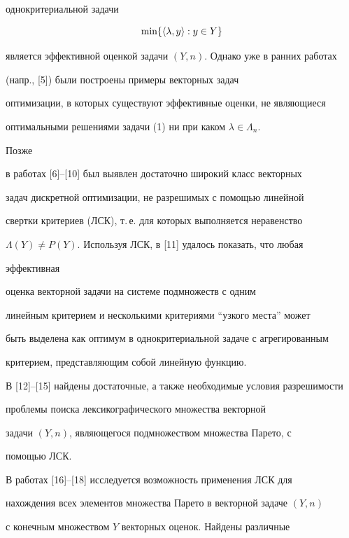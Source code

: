 однокритериальной задачи 


\begin{equation} 


\min\{\la\lambda,y\ra:y\in Y\} 


\end{equation} 


является эффективной оценкой задачи $(Y,n)$. Однако уже в ранних работах 


(напр., [5]) были построены примеры векторных задач 


оптимизации, в которых существуют эффективные оценки, не являющиеся 


оптимальными решениями задачи (1) ни при каком $\lambda\in\Lambda_n$. 


Позже 


в работах [6]--[10] был выявлен достаточно широкий класс векторных 


задач дискретной оптимизации, не разрешимых с помощью линейной 


свертки критериев (ЛСК), т.\,е. для которых выполняется неравенство 


$\Lambda(Y)\ne P(Y)$. Используя ЛСК, в [11] удалось показать, что любая 


эффективная 


оценка векторной задачи на системе подмножеств с одним 


линейным критерием и несколькими критериями ``узкого места'' может 


быть выделена как оптимум в однокритериальной задаче с агрегированным 


критерием, представляющим собой линейную функцию. 


 


В [12]--[15] найдены достаточные, а также необходимые условия разрешимости 


проблемы поиска лексикографического множества векторной 


задачи $(Y,n)$, являющегося подмножеством множества Парето, с 


помощью ЛСК. 


 


В работах [16]--[18] исследуется возможность применения ЛСК для 


нахождения всех элементов множества Парето в векторной задаче $(Y,n)$ 


с конечным множеством $Y$ векторных оценок. Найдены различные 


